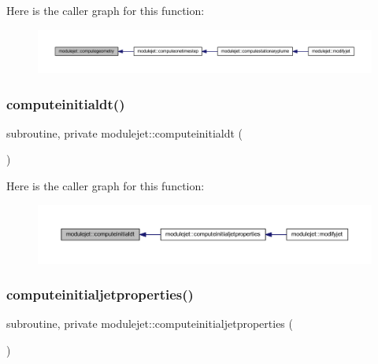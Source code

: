 Here is the caller graph for this function\+:\nopagebreak
\begin{figure}[H]
\begin{center}
\leavevmode
\includegraphics[width=350pt]{namespacemodulejet_a0d3bcdd114f549e27a46b673224a1f35_icgraph}
\end{center}
\end{figure}
\mbox{\label{namespacemodulejet_a0425b9fdbf288a0e893428f44a92b9ea}} 
\subsubsection{\texorpdfstring{computeinitialdt()}{computeinitialdt()}}
{\footnotesize\ttfamily subroutine, private modulejet\+::computeinitialdt (\begin{DoxyParamCaption}{ }\end{DoxyParamCaption})\hspace{0.3cm}{\ttfamily [private]}}

Here is the caller graph for this function\+:\nopagebreak
\begin{figure}[H]
\begin{center}
\leavevmode
\includegraphics[width=350pt]{namespacemodulejet_a0425b9fdbf288a0e893428f44a92b9ea_icgraph}
\end{center}
\end{figure}
\mbox{\label{namespacemodulejet_a8b1ef801e649c2313fee9754d2aeb58a}} 
\subsubsection{\texorpdfstring{computeinitialjetproperties()}{computeinitialjetproperties()}}
{\footnotesize\ttfamily subroutine, private modulejet\+::computeinitialjetproperties (\begin{DoxyParamCaption}{ }\end{DoxyParamCaption})\hspace{0.3cm}{\ttfamily [private]}}


